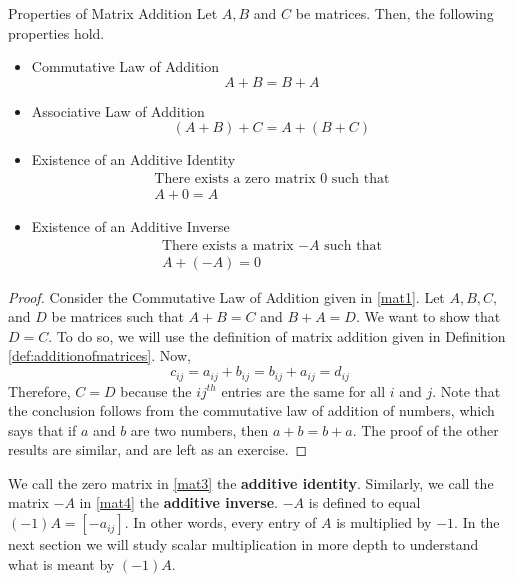 \begin{proposition}{Properties of Matrix Addition}\label{prop:propertiesofaddition}
Let $A,B$ and $C$ be matrices. Then, the following properties  hold. 

\begin{itemize}
\item Commutative Law of Addition
\begin{equation}
A+B=B+A  \label{mat1}
\end{equation}

\item Associative Law of Addition
\begin{equation}
\left( A+B\right) +C=A+\left( B+C\right) \label{mat2}
\end{equation}

\item Existence of an Additive Identity
\begin{equation}
\begin{array}{c}
\mbox{There exists a zero matrix 0 such that}\\
A+0=A  \label{mat3}
\end{array}
\end{equation}

\item Existence of an Additive Inverse
\begin{equation}
\begin{array}{c}
\mbox{There exists a matrix $-A$ such that} \\
A+\left( -A\right) =0 \label{mat4}
\end{array}
\end{equation}
\end{itemize}
\end{proposition}

\ifdefined\showproofs
\begin{proof}
Consider the Commutative Law of Addition given in \ref{mat1}. Let $A,B,C,$ and $D$ be matrices such that $A+B=C$ and 
$B+A=D.$ We want to show that $D=C$. To do so, we will use the definition of matrix addition given in Definition \ref{def:additionofmatrices}.
Now,
\begin{equation*}
c_{ij}=a_{ij}+b_{ij}=b_{ij}+a_{ij}=d_{ij}
\end{equation*}
Therefore, $C=D$ because the $ij^{th}$ entries are the same for all $i$ and $j$. Note that the
conclusion follows from the commutative law of addition of numbers, which says that if $a$ and $b$ are two numbers,
then $a+b = b+a$. 
The proof of the other results are similar, and are left as an exercise.
\end{proof}
\fi

We call the zero matrix in \ref{mat3} the \textbf{additive identity}. Similarly, we call the matrix $-A$
in \ref{mat4} the \textbf{additive inverse}. $-A$ is 
defined to equal $\left( -1\right) A = [-a_{ij}].$ In other words, every entry of $A$ is multiplied by $-1$.
In the next section we will study scalar multiplication in more depth 
to understand what is meant by  $\left( -1\right) A.$